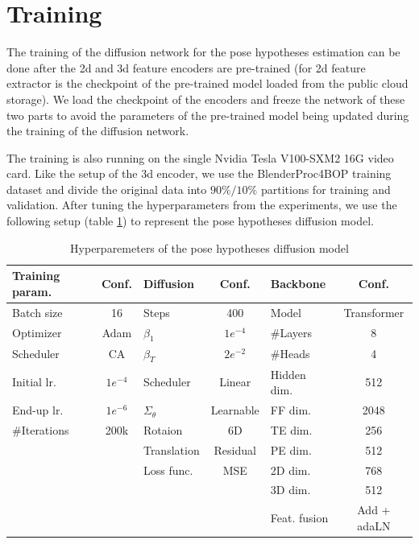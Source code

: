\documentclass[12pt,DIV14,BCOR12mm,a4paper,footinclude=false,headinclude,parskip=half-,twoside,openright,cleardoublepage=empty,toc=index,bibliography=totoc,listof=totoc]{scrreprt}
\numberwithin{equation}{chapter}
\begin{document}
\section{Training} 
The training of the diffusion network for the pose hypotheses estimation can be done after the \gls{2d} and \gls{3d} feature encoders are pre-trained (for \gls{2d} feature extractor is the checkpoint of the pre-trained model loaded from the public cloud storage). We load the checkpoint of the encoders and freeze the network of these two parts to avoid the parameters of the pre-trained model being updated during the training of the diffusion network. 

The training is also running on the single Nvidia Tesla V100-SXM2 16G video card. Like the setup of the \gls{3d} encoder, we use the BlenderProc4BOP training dataset and divide the original data into $90\%/10\%$ partitions for training and validation. After tuning the hyperparameters from the experiments, we use the following setup (table \ref{tab:hyper}) to represent the pose hypotheses diffusion model.
\begin{table}[h]
  \centering
  \caption{Hyperparemeters of the pose hypotheses diffusion model}
  \label{tab:hyper}
  \begin{tabular}{l c | l c | l c}
      \toprule
      Training param. & Conf. & Diffusion & Conf. & Backbone & Conf.\\
      \midrule
      Batch size & 16 & Steps & 400 & Model & Transformer\\
      Optimizer & Adam & $\beta_{1}$ & $1e^{-4}$ & \#Layers & 8\\
      Scheduler & CA & $\beta_{T}$ & $2e^{-2}$ & \#Heads & 4\\
      Initial lr. & $1e^{-4}$ & Scheduler & Linear & Hidden dim. & 512\\
      End-up lr. & $1e^{-6}$ & $\Sigma_{\theta}$ & Learnable & FF dim. & 2048\\
      \#Iterations & 200k & Rotaion & 6D & TE dim. & 256\\
       &  & Translation & Residual & PE dim. & 512\\
       &  & Loss func. & MSE & 2D dim. & 768\\
       &  & & & 3D dim. & 512\\
       &  & & & Feat. fusion & Add + adaLN\\
      \bottomrule
  \end{tabular}
\end{table}
\end{document}
